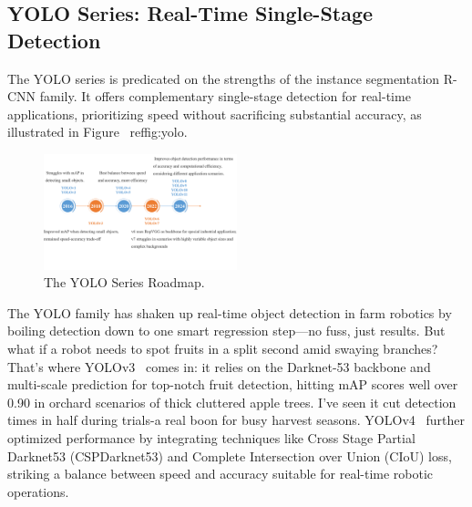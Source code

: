 \documentclass[a4paper,fleqn]{cas-dc}
\begin{document}
\subsection{YOLO Series: Real-Time Single-Stage Detection}
The YOLO series is predicated on the strengths of the instance segmentation R-CNN family. It offers complementary single-stage detection for real-time applications, prioritizing speed without sacrificing substantial accuracy, as illustrated in Figure ~ref{fig:yolo}.
\begin{figure}[hbtp]
\centering
\includegraphics[width=0.5\textwidth]{fig_yolo.png}
\caption{The YOLO Series Roadmap.}
\label{fig:yolo}
\end{figure}

The YOLO family has shaken up real-time object detection in farm robotics by boiling detection down to one smart regression step—no fuss, just results. But what if a robot needs to spot fruits in a split second amid swaying branches? That's where YOLOv3~\cite{redmon2018yolov3} comes in: 
it relies on the Darknet-53 backbone and multi-scale prediction for top-notch fruit detection, hitting mAP scores well over 0.90 in orchard scenarios of thick cluttered apple trees. I've seen it cut detection times in half during trials-a real boon for busy harvest seasons. YOLOv4~\cite{bochkovskiy2020yolov4} further optimized performance by integrating techniques like Cross Stage Partial Darknet53 (CSPDarknet53) and Complete Intersection over Union (CIoU) loss, striking a balance between speed and accuracy suitable for real-time robotic operations. 
\end{document}
